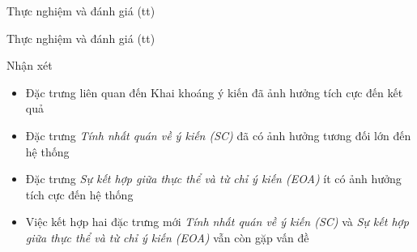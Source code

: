 \documentclass{beamer}
\begin{document}
		\begin{frame}{Thực nghiệm và đánh giá (tt)}									
			\begin{table}[]
				\centering
				\caption{Kết quả thực nghiệm}
			\end{table}			
		\end{frame}

		\begin{frame}{Thực nghiệm và đánh giá (tt)}			
			\begin{block}{Nhận xét}
			\begin{itemize}
				\item{Đặc trưng liên quan đến Khai khoáng ý kiến đã ảnh hưởng tích cực đến kết quả}
				\item{Đặc trưng \textit{Tính nhất quán về ý kiến (SC)} đã có ảnh hưởng tương đối lớn đến hệ thống}
				\item{Đặc trưng \textit{Sự kết hợp giữa thực thể và từ chỉ ý kiến (EOA)} ít có ảnh hưởng tích cực đến hệ thống}
				\item{Việc kết hợp hai đặc trưng mới \textit{Tính nhất quán về ý kiến (SC)} và \textit{Sự kết hợp giữa thực thể và từ chỉ ý kiến (EOA)} vẫn còn gặp vấn đề}
			\end{itemize}				
			\end{block}						
		\end{frame}
\end{document}
